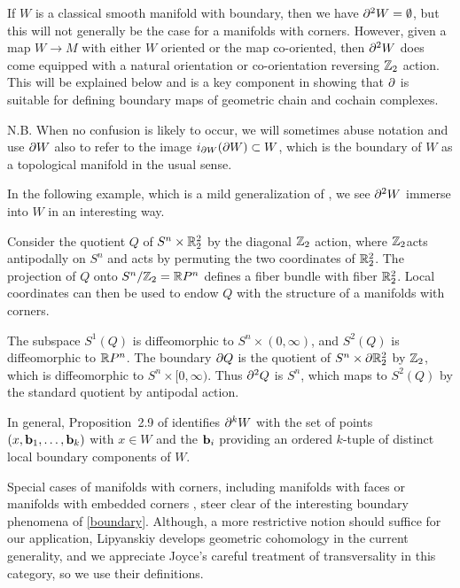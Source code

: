 If $W$ is a classical smooth manifold with boundary, then we have $\partial^2 W=\emptyset$, but this will not generally be the case for a manifolds with corners.
However, given a map $W \to M$ with either $W$ oriented or the map co-oriented, then $\partial^2 W$ does come equipped with a natural orientation or co-orientation reversing $\mathbb{Z}_2$ action.
This will be explained below and is a key component in showing that $\partial$ is suitable for defining boundary maps of geometric chain and cochain complexes.

N.B. When no confusion is likely to occur, we will sometimes abuse notation and use $\partial W$ also to refer to the image $i_{\partial W}(\partial W) \subset W$, which is the boundary of $W$ as a topological manifold in the usual sense.

In the following example, which is a mild generalization of \cite[Example 7.3]{Joy12}, we see $\partial^2 W$ immerse into $W$ in an interesting way.

\begin{example}\label{boundary}
	Consider the quotient $Q$ of $S^n \times \mathbb{R}^2_2$ by the diagonal $\mathbb{Z}_2$ action, where $\mathbb{Z}_2$acts antipodally on $S^n$ and acts by permuting the two coordinates
	of $\mathbb{R}^2_2$.
	The projection of $Q$ onto $S^n / \mathbb{Z}_2 = \mathbb{R} P^n$ defines a fiber bundle with fiber $\mathbb{R}^2_2$.
	Local coordinates can then be used to endow $Q$ with the structure of a manifolds with corners.

	The subspace $S^1(Q)$ is diffeomorphic to $S^n \times (0,\infty)$, and $S^2(Q)$ is diffeomorphic to $\mathbb{R} P^n$.
	The boundary $\partial Q$ is the quotient of $S^n \times \partial \mathbb{R}^2_2$ by $\mathbb{Z}_2$, which is diffeomorphic to
	$S^n \times [0,\infty)$.
	Thus $\partial^2 Q$ is $S^n$, which maps to $S^2(Q)$ by the standard quotient by antipodal action.
\end{example}

In general, Proposition~2.9 of \cite{Joy12} identifies $\partial^k W$ with the set of points $(x,\mathbf{b}_1,\ldots,\mathbf{b}_k)$ with $x \in W$ and the $\mathbf{b}_i$ providing an ordered $k$-tuple of distinct local boundary components of $W$.

\begin{comment}
\end{comment}

Special cases of manifolds with corners, including
manifolds with faces or manifolds with embedded corners \cite{Joy12}, steer clear of the interesting boundary phenomena of \cref{boundary}.
Although, a more restrictive notion should suffice for our application, Lipyanskiy develops geometric cohomology in the current generality, and we appreciate Joyce's careful treatment of transversality in this category, so we use their definitions.

